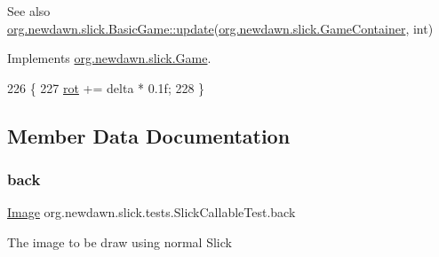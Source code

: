 \begin{DoxySeeAlso}{See also}
\mbox{\hyperlink{classorg_1_1newdawn_1_1slick_1_1_basic_game_acfe6fa05aef83bff1631af91a3e4bd20}{org.\+newdawn.\+slick.\+Basic\+Game\+::update}}(\mbox{\hyperlink{classorg_1_1newdawn_1_1slick_1_1_game_container}{org.\+newdawn.\+slick.\+Game\+Container}}, int) 
\end{DoxySeeAlso}


Implements \mbox{\hyperlink{interfaceorg_1_1newdawn_1_1slick_1_1_game_ab07b2e9463ee4631620dde0de25bdee8}{org.\+newdawn.\+slick.\+Game}}.


\begin{DoxyCode}
226                                                            \{
227         \mbox{\hyperlink{classorg_1_1newdawn_1_1slick_1_1tests_1_1_slick_callable_test_a5a8dc15fc39af58f212dd3f482f7a57f}{rot}} += delta * 0.1f;
228     \}
\end{DoxyCode}


\subsection{Member Data Documentation}
\mbox{\label{classorg_1_1newdawn_1_1slick_1_1tests_1_1_slick_callable_test_a8bde07ec49e362d281166d69996bc082}} 
\subsubsection{\texorpdfstring{back}{back}}
{\footnotesize\ttfamily \mbox{\hyperlink{classorg_1_1newdawn_1_1slick_1_1_image}{Image}} org.\+newdawn.\+slick.\+tests.\+Slick\+Callable\+Test.\+back\hspace{0.3cm}{\ttfamily [private]}}

The image to be draw using normal Slick \mbox{\label{classorg_1_1newdawn_1_1slick_1_1tests_1_1_slick_callable_test_a0854b55fb448f5c331d07f464ca45652}} 
